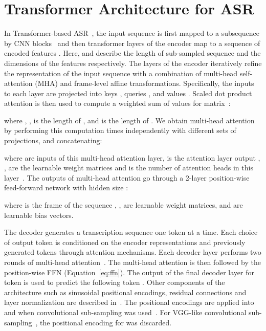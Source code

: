 \documentclass{article}
\begin{document}
\section{Transformer Architecture for ASR}

In Transformer-based  ASR~\citep{karita2019asru, karita2019is}, the input sequence  is first mapped to a subsequence  by CNN blocks~\citep{dong2018speech,karita2019asru} and then transformer layers of the encoder map  to a sequence of encoded features . Here,  and  describe the length of sub-sampled sequence and the dimensions of the features respectively. The layers of the encoder iteratively refine the representation of the input sequence with a combination of multi-head self-attention (MHA) and frame-level affine transformations. Specifically, the inputs to each layer are projected into keys , queries , and values . Scaled dot product attention is then used to compute a weighted sum of values for  matrix~\citep{vaswani2017attention}:


where , ,  is the length of , and  is the length of .
We obtain multi-head attention by performing this computation  times independently with different sets of projections, and concatenating:


where  are inputs of this multi-head attention layer,  is the  attention layer output , ,  are the learnable weight matrices and  is the number of attention heads in this layer~\citep{vaswani2017attention,karita2019asru}.
The outputs of multi-head attention  go through a 2-layer position-wise feed-forward network with hidden size :


where  is the  frame of the sequence , ,  are learnable weight matrices,  and  are learnable bias vectors. 

The decoder generates a transcription sequence  one token at a time. Each choice of output token  is conditioned on the encoder representations  and previously generated tokens  through attention mechanisms. Each decoder layer performs two rounds of multi-head attention~\citep{karita2019asru}.
The multi-head attention is then followed by the position-wise FFN (Equation~\ref{eq:ffn}).  The output of the final decoder layer for token  is used to predict the following token . Other components of the architecture such as sinusoidal positional encodings, residual connections and layer normalization are described in~\citep{vaswani2017attention}. The positional encodings are applied into  and  when convolutional sub-sampling was used~\citep{karita2019asru,espnet}. For VGG-like convolutional sub-sampling~\citep{wang2020a}, the positional encoding for  was discarded.
\end{document}
